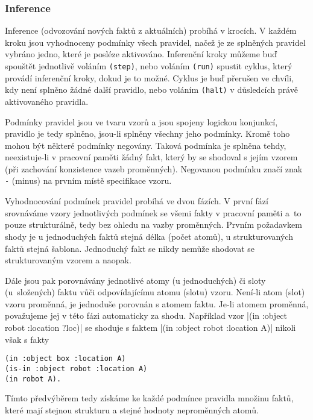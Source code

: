 \subsubsection{Inference}
\label{inference}

Inference (odvozování nových faktů z aktuálních) probíhá v krocích. V každém
kroku jsou vyhodnoceny podmínky všech pravidel, načež je ze splněných pravidel
vybráno jedno, které je posléze aktivováno. Inferenční kroky můžeme buď spouštět
jednotlivě voláním \verb|(step)|, nebo voláním \verb|(run)| spustit
cyklus, který provádí inferenční kroky, dokud je to možné. Cyklus je buď
přerušen ve chvíli, kdy není splněno žádné další pravidlo, nebo voláním
\verb|(halt)| v důsledcích právě aktivovaného pravidla.

Podmínky pravidel jsou ve tvaru vzorů a jsou spojeny logickou konjunkcí,
pravidlo je tedy splněno, jsou-li splněny všechny jeho podmínky. Kromě
toho mohou být některé podmínky negovány. Taková podmínka je splněna tehdy,
neexistuje-li v pracovní paměti žádný fakt, který by se shodoval s jejím vzorem
(při zachování konzistence vazeb proměnných). Negovanou podmínku značí znak
\verb|-| (minus) na prvním místě specifikace vzoru.

Vyhodnocování podmínek pravidel probíhá ve dvou fázích. V první fází srovnáváme
vzory jednotlivých podmínek se všemi fakty v pracovní paměti a~to pouze
strukturálně, tedy bez ohledu na vazby proměnných. Prvním požadavkem shody je u
jednoduchých faktů stejná délka (počet atomů), u strukturovaných faktů stejná
šablona. Jednoduchý fakt se nikdy nemůže shodovat se strukturovaným vzorem a
naopak.

Dále jsou pak porovnávány jednotlivé atomy (u jednoduchých) či
sloty (u~složených) faktu vůči odpovídajícímu atomu (slotu) vzoru. Není-li atom
(slot) vzoru proměnná, je jednoduše porovnán s atomem faktu. Je-li atomem
proměnná, považujeme jej v této fázi automaticky za shodu. Například vzor
\cl|(in :object robot :location ?loc)|
se shoduje s faktem
\cl|(in :object robot :location A)|
nikoli však s fakty
\begin{verbatim}
(in :object box :location A)
(is-in :object robot :location A)
(in robot A).
\end{verbatim}
Tímto předvýběrem
tedy získáme ke každé podmínce pravidla množinu faktů, které mají stejnou
strukturu a stejné hodnoty neproměnných atomů.


